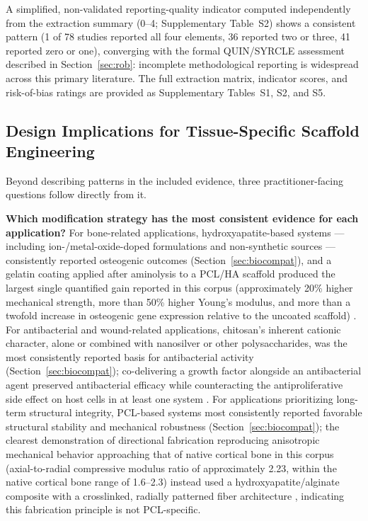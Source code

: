 \documentclass[5p,times,twocolumn]{elsarticle}
\begin{document}
A simplified, non-validated reporting-quality indicator computed independently from the extraction summary (0--4; Supplementary Table~S2) shows a consistent pattern (1 of 78 studies reported all four elements, 36 reported two or three, 41 reported zero or one), converging with the formal QUIN/SYRCLE assessment described in Section~\ref{sec:rob}: incomplete methodological reporting is widespread across this primary literature. The full extraction matrix, indicator scores, and risk-of-bias ratings are provided as Supplementary Tables~S1, S2, and S5.

\subsection{Design Implications for Tissue-Specific Scaffold Engineering}
\label{sec:design-implications}

Beyond describing patterns in the included evidence, three practitioner-facing questions follow directly from it.

\textbf{Which modification strategy has the most consistent evidence for each application?} For bone-related applications, hydroxyapatite-based systems --- including ion-/metal-oxide-doped formulations and non-synthetic sources --- consistently reported osteogenic outcomes (Section~\ref{sec:biocompat}), and a gelatin coating applied after aminolysis to a PCL/HA scaffold produced the largest single quantified gain reported in this corpus (approximately 20\% higher mechanical strength, more than 50\% higher Young's modulus, and more than a twofold increase in osteogenic gene expression relative to the uncoated scaffold) \cite{ref18}. For antibacterial and wound-related applications, chitosan's inherent cationic character, alone or combined with nanosilver or other polysaccharides, was the most consistently reported basis for antibacterial activity (Section~\ref{sec:biocompat}); co-delivering a growth factor alongside an antibacterial agent preserved antibacterial efficacy while counteracting the antiproliferative side effect on host cells in at least one system \cite{ref25}. For applications prioritizing long-term structural integrity, PCL-based systems most consistently reported favorable structural stability and mechanical robustness (Section~\ref{sec:biocompat}); the clearest demonstration of directional fabrication reproducing anisotropic mechanical behavior approaching that of native cortical bone in this corpus (axial-to-radial compressive modulus ratio of approximately 2.23, within the native cortical bone range of 1.6--2.3) instead used a hydroxyapatite/alginate composite with a crosslinked, radially patterned fiber architecture \cite{ref1}, indicating this fabrication principle is not PCL-specific.
\end{document}
